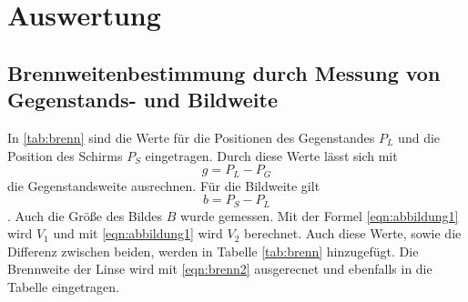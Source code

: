 \section{Auswertung}
\label{sec:Auswertung}

\subsection{Brennweitenbestimmung durch Messung von Gegenstands- und Bildweite}

In \ref{tab:brenn} sind die Werte für die Positionen des Gegenstandes $P_L$ und die Position des Schirms $P_S$ eingetragen.
Durch diese Werte lässt sich mit
\begin{equation}
  g=P_L-P_G
\end{equation}
die Gegenstandsweite ausrechnen.
Für die Bildweite gilt
\begin{equation}
  b=P_S-P_L
\end{equation}.
Auch die Größe des Bildes $B$ wurde gemessen.
Mit der Formel \ref{eqn:abbildung1} wird $V_1$ und mit \ref{eqn:abbildung1} wird $V_2$ berechnet.
Auch diese Werte, sowie die Differenz zwischen beiden, werden in Tabelle \ref{tab:brenn} hinzugefügt.
Die Brennweite der Linse wird mit \ref{eqn:brenn2} ausgerecnet und ebenfalls in die Tabelle eingetragen.

